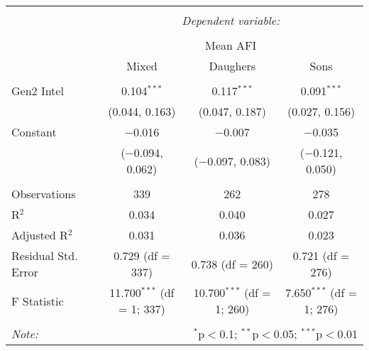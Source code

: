 
\begingroup 
\small 
\begin{tabular}{@{\extracolsep{1pt}}lccc} 
\\[-1.8ex]\hline 
\hline \\[-1.8ex] 
 & \multicolumn{3}{c}{\textit{Dependent variable:}} \\ 
\cline{2-4} 
\\[-1.8ex] & \multicolumn{3}{c}{Mean AFI} \\ 
 & Mixed & Daughers & Sons \\ 
\hline \\[-1.8ex] 
 Gen2 Intel & 0.104$^{***}$ & 0.117$^{***}$ & 0.091$^{***}$ \\ 
  & (0.044, 0.163) & (0.047, 0.187) & (0.027, 0.156) \\ 
  Constant & $-$0.016 & $-$0.007 & $-$0.035 \\ 
  & ($-$0.094, 0.062) & ($-$0.097, 0.083) & ($-$0.121, 0.050) \\ 
 \hline \\[-1.8ex] 
Observations & 339 & 262 & 278 \\ 
R$^{2}$ & 0.034 & 0.040 & 0.027 \\ 
Adjusted R$^{2}$ & 0.031 & 0.036 & 0.023 \\ 
Residual Std. Error & 0.729 (df = 337) & 0.738 (df = 260) & 0.721 (df = 276) \\ 
F Statistic & 11.700$^{***}$ (df = 1; 337) & 10.700$^{***}$ (df = 1; 260) & 7.650$^{***}$ (df = 1; 276) \\ 
\hline 
\hline \\[-1.8ex] 
\textit{Note:}  & \multicolumn{3}{r}{$^{*}$p$<$0.1; $^{**}$p$<$0.05; $^{***}$p$<$0.01} \\ 
\end{tabular} 
\endgroup 
